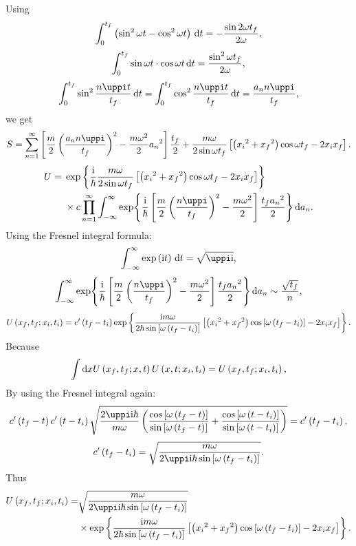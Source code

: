 \documentclass[english,log-declarations=false]{article}
\begin{document}
Using 
\[\int_0^{t_f}\left(\sin^2\omega t-\cos^2\omega t\right)\,\mathrm{d} t=-\frac{\sin2\omega t_f}{2\omega}\text{,}\]
\[\int_0^{t_f}\sin\omega t\cdot\cos\omega t\,\mathrm{d} t=\frac{\sin^2\omega t_f}{2\omega}\text{,}\]
\[\int_0^{t_f}\sin^2\frac{n\piup t}{t_f} \ndd t=\int_0^{t_f}\cos^2\frac{n\piup t}{t_f} \ndd t=\frac{a_n n \piup}{t_f}\ec\]
we get
\[S=\sum_{n=1}^\infty\left[\frac{m}{2}\lb\frac{a_n n \piup}{t_f}\rb^2-\frac{m\omega^2}{2}{a_n}^2\right]\frac{t_f}{2}+\frac{m\omega}{2\sin\omega t_f}\left[\lb {x_i}^2+{x_f}^2\rb\cos\omega t_f-2 x_i x_f\right]\ed\]
\[\begin{split}U={}&\exp\left\{\frac{\ii}{\hbar}\frac{m\omega}{2\sin\omega t_f}\left[\lb {x_i}^2+{x_f}^2\rb\cos\omega t_f-2 x_i x_f\right]\right\}\\%
&{}\times c\prod_{n=1}^{\infty}\int_{-\infty}^\infty\exp{\frac{\ii}{\hbar}\left[\frac{m}{2}\lb\frac{n \piup}{t_f}\rb^2-\frac{m\omega^2}{2}\right]\frac{t_f {a_n}^2}{2}}\ndd a_n\ed\end{split}\]
Using the Fresnel integral formula:
\[\int_{-\infty}^\infty\exp\lb \ii t\rb\ndd t=\sqrt{\piup \ii}\ec\]
\[\int_{-\infty}^\infty\exp{\frac{\ii}{\hbar}\left[\frac{m}{2}\lb\frac{n \piup}{t_f}\rb^2-\frac{m\omega^2}{2}\right]\frac{t_f {a_n}^2}{2}}\ndd a_n\sim\frac{\sqrt{t_f}}{n}\ec\]
\[U\left( x_f,t_f;x_i,t_i\right)=c'\left( t_f-t_i\right)\exp\left\{\frac{\mathrm{i} m\omega}{2\hbar\sin\left[\omega \left( t_f-t_i\right)\right]}\left[\left( {x_i}^2+{x_f}^2\right)\cos\left[\omega\left( t_f-t_i\right)\right]-2 x_i x_f\right]\right\}\text{.}\]
Because \[\int\dd x U\left( x_f,t_f;x,t\right) U\left( x,t;x_i,t_i\right)=U\left( x_f,t_f;x_i,t_i\right)\text{,}\]
By using the Fresnel integral again:
\[c'\lb t_f-t\rb c'\lb t-t_i\rb\sqrt{\frac{2 \piup \ii \hbar}{m \omega}\lb\frac{\cos\left[\omega\lb t_f-t\rb\right]}{\sin\left[\omega\lb t_f-t\rb\right]}+\frac{\cos\left[\omega\lb t-t_i\rb\right]}{\sin\left[\omega\lb t-t_i\rb\right]}\rb}=c'\lb t_f-t_i\rb\ec\]
\[c'\lb t_f-t_i\rb=\sqrt{\frac{m\omega}{2\piup \ii \hbar\sin\left[\omega\lb t_f-t_i\rb\right]}}\ed\]
Thus
\[\begin{split}U\lb x_f,t_f;x_i,t_i\rb=&\sqrt{\frac{m\omega}{2\piup \ii \hbar\sin\left[\omega\lb t_f-t_i\rb\right]}}\\&{}\times\exp\left\{\frac{\ii m\omega}{2\hbar\sin\left[\omega \lb t_f-t_i\rb\right]}\left[\lb {x_i}^2+{x_f}^2\rb\cos\left[\omega\lb t_f-t_i\rb\right]-2 x_i x_f\right]\right\}\ed\end{split}\]


\fi
\end{document}
